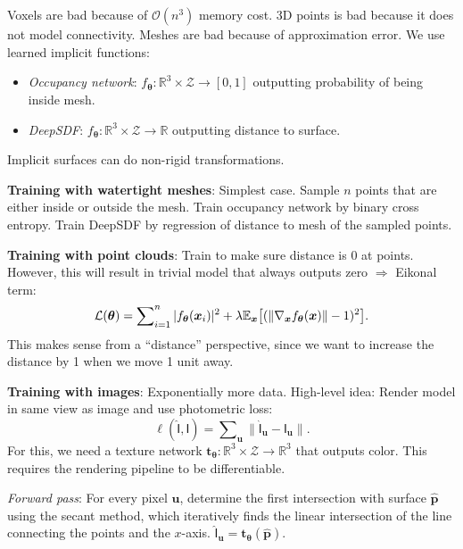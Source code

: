 \documentclass{article}
\newcommand{\lft}{\mathopen{}\mathclose\bgroup\left}
\newcommand{\rgt}{\aftergroup\egroup\right}
\newcommand{\E}{\mathbb{E}}
\newcommand{\R}{\mathbb{R}}
\renewcommand{\vec}[1]{\bm{#1}}
\newcommand{\tens}[1]{\bm{\mathsf{#1}}}
\newenvironment{topic}[1]
{\textbf{\sffamily \colorbox{black}{\rlap{\textbf{\textcolor{white}{#1}}}\hspace{\linewidth}\hspace{-2\fboxsep}}} \\ \vspace{0.2cm}}
{}
\begin{document}
\begin{multicols*}{2}
\begin{topic}{Reinforcement learning}
    \end{topic}

    \begin{topic}{Implicit surfaces and neural radiance fields}
        Voxels are bad because of $\mathcal{O}(n^3)$ memory cost. 3D points is bad because it does not
        model connectivity. Meshes are bad because of approximation error. We use learned implicit
        functions:
        \begin{itemize}
            \item \textit{Occupancy network}: $f_{\vec{\theta}}: \R^3 \times \mathcal{Z} \to [0,1]$ outputting probability of
                  being inside mesh.
            \item \textit{DeepSDF}: $f_{\vec{\theta}}: \R^3 \times \mathcal{Z} \to \R$ outputting distance to surface.
        \end{itemize}
        Implicit surfaces can do non-rigid transformations.

        \textbf{Training with watertight meshes}: Simplest case. Sample $n$ points that are either
        inside or outside the mesh. Train occupancy network by binary cross entropy. Train DeepSDF by
        regression of distance to mesh of the sampled points.

        \textbf{Training with point clouds}: Train to make sure distance is 0 at points. However, this will result in trivial model that always outputs zero $\Rightarrow$ Eikonal term: \[
            \mathcal{L}(\vec{\theta}) = \sum\nolimits_{i=1}^{n} |f_{\vec{\theta}}(\vec{x}_i)|^2  + \lambda \E_{\vec{x}} \lft[ (\| \nabla_{\vec{x}} f_{\vec{\theta}}(\vec{x}) \| - 1)^2 \rgt].
        \]
        This makes sense from a ``distance'' perspective, since we want to increase the distance by 1 when
        we move 1 unit away.

        \textbf{Training with images}: Exponentially more data. High-level idea: Render model in same
        view as image and use photometric loss: \[
            \ell(\hat{\tens{I}}, \tens{I}) = \sum\nolimits_{\vec{u}} \| \hat{\tens{I}}_{\vec{u}} - \tens{I}_{\vec{u}} \| .
        \]
        For this, we need a texture network $\vec{t}_{\vec{\theta}}: \R^3 \times \mathcal{Z} \to \R^3$ that
        outputs color. This requires the rendering pipeline to be differentiable.

        \textit{Forward pass}: For every pixel $\vec{u}$, determine the first intersection with surface
        $\hat{\vec{p}}$ using the secant method, which iteratively finds the linear intersection of the
        line connecting the points and the $x$-axis. $\hat{\tens{I}}_{\vec{u}} =
            \vec{t}_{\vec{\theta}}(\hat{\vec{p}})$.


\end{topic}
\end{multicols*}
\end{document}
